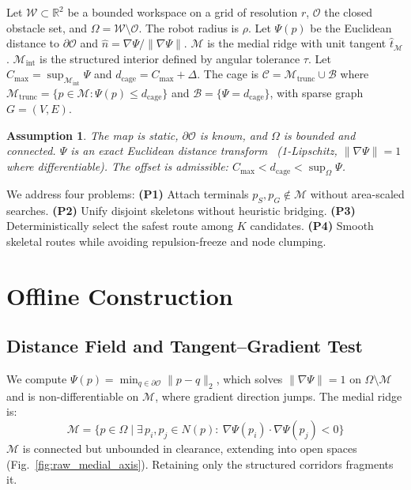 \documentclass[conference]{IEEEtran}
\newtheorem{assumption}{Assumption}
\begin{document}
Let $\mathcal{W}\subset\mathbb{R}^2$ be a bounded workspace on a grid of resolution $r$, $\mathcal{O}$ the closed obstacle set, and $\Omega=\mathcal{W}\setminus\mathcal{O}$. The robot radius is $\rho$. Let $\Psi(p)$ be the Euclidean distance to $\partial\mathcal{O}$ and $\hat{n}=\nabla\Psi/\|\nabla\Psi\|$. $\mathcal{M}$ is the medial ridge with unit tangent $\hat{t}_{\mathcal{M}}$. $\mathcal{M}_{\mathrm{int}}$ is the structured interior defined by angular tolerance $\tau$. Let $C_{\max}=\sup_{\mathcal{M}_{\mathrm{int}}}\Psi$ and $d_{\mathrm{cage}}=C_{\max}+\Delta$. The cage is $\mathcal{C}=\mathcal{M}_{\mathrm{trunc}}\cup\mathcal{B}$ where $\mathcal{M}_{\mathrm{trunc}}=\{p\in\mathcal{M}:\Psi(p)\le d_{\mathrm{cage}}\}$ and $\mathcal{B}=\{\Psi=d_{\mathrm{cage}}\}$, with sparse graph $G=(V,E)$. 

\begin{assumption}
\label{asm:setting}
The map is static, $\partial\mathcal{O}$ is known, and $\Omega$ is bounded and connected. $\Psi$ is an exact Euclidean distance transform~\cite{felzenszwalb2012} (1-Lipschitz, $\|\nabla\Psi\|=1$ where differentiable). The offset is admissible: $C_{\max}<d_{\mathrm{cage}}<\sup_{\Omega}\Psi$.
\end{assumption}

We address four problems: \textbf{(P1)} Attach terminals $p_S,p_G\notin\mathcal{M}$ without area-scaled searches. \textbf{(P2)} Unify disjoint skeletons without heuristic bridging. \textbf{(P3)} Deterministically select the safest route among $K$ candidates. \textbf{(P4)} Smooth skeletal routes while avoiding repulsion-freeze and node clumping.

\section{Offline Construction}
\label{sec:offline}

\subsection{Distance Field and Tangent--Gradient Test}

We compute $\Psi(p)=\min_{q\in\partial\mathcal{O}}\|p-q\|_2$, which solves $\|\nabla\Psi\|=1$ on $\Omega\setminus\mathcal{M}$ and is non-differentiable on $\mathcal{M}$, where gradient direction jumps. The medial ridge is:
\begin{equation}
\mathcal{M}=\{p\in\Omega \mid \exists\, p_i,p_j\in N(p):\ \nabla\Psi(p_i)\cdot\nabla\Psi(p_j)<0\}
\label{eq:ridge}
\end{equation}
$\mathcal{M}$ is connected but unbounded in clearance, extending into open spaces (Fig.~\ref{fig:raw_medial_axis}). Retaining only the structured corridors fragments it.
\end{document}
